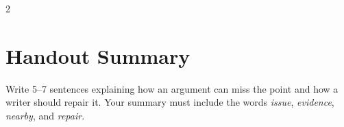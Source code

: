 \documentclass[12pt]{article}
\begin{document}
\begin{multicols}{2}
\section*{Handout Summary}
Write 5--7 sentences explaining how an argument can miss the point and how a writer should repair it. Your summary must include the words \textit{issue}, \textit{evidence}, \textit{nearby}, and \textit{repair}.
\end{multicols}
\end{document}
